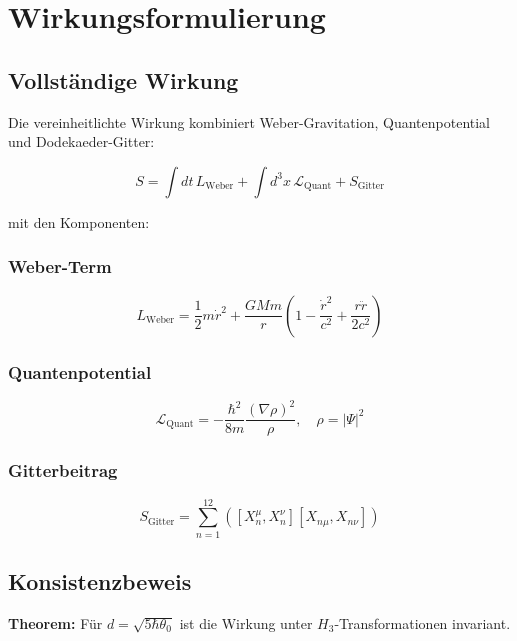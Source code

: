 \newpage
\section{Wirkungsformulierung}

\subsection{Vollständige Wirkung}

Die vereinheitlichte Wirkung kombiniert Weber-Gravitation, Quantenpotential und Dodekaeder-Gitter:

\begin{equation}
S = \int dt\, L_{\text{Weber}} + \int d^3x\, \mathcal{L}_{\text{Quant}} + S_{\text{Gitter}}
\end{equation}

mit den Komponenten:

\subsubsection{Weber-Term}
\begin{equation}
L_{\text{Weber}} = \frac{1}{2}m\dot{r}^2 + \frac{GMm}{r}\left(1 - \frac{\dot{r}^2}{c^2} + \frac{r\ddot{r}}{2c^2}\right)
\end{equation}

\subsubsection{Quantenpotential}
\begin{equation}
\mathcal{L}_{\text{Quant}} = -\frac{\hbar^2}{8m}\frac{(\nabla\rho)^2}{\rho}, \quad \rho = |\Psi|^2
\end{equation}

\subsubsection{Gitterbeitrag}
\begin{equation}
S_{\text{Gitter}} = \sum_{n=1}^{12} \left( [X_n^\mu, X_n^\nu][X_{n\mu}, X_{n\nu}] \right)
\end{equation}

\subsection{Konsistenzbeweis}

\textbf{Theorem:} Für $d = \sqrt{5\hbar\theta_0}$ ist die Wirkung unter $H_3$-Transformationen invariant.

